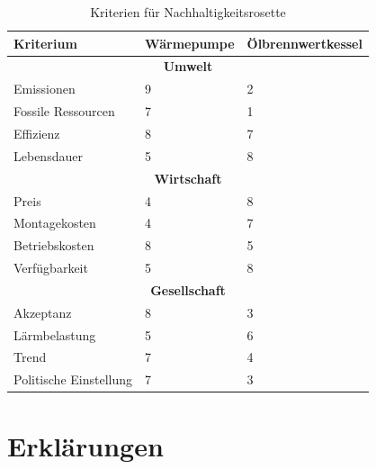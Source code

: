 \begin{table}
\begin{center}
\begin{tabular}[c]{|p{}|p{}|p{}|}

  \hline
  \textbf{Kriterium} &
  \textbf{Wärmepumpe} &
  \textbf{Ölbrennwertkessel} \\ \hline

  \multicolumn{3}{|c|}{\textbf{Umwelt}} \\ \hline
  
  Emissionen
  & 9 & 2 \\
  Fossile Ressourcen
  & 7 & 1 \\
  Effizienz
  & 8 & 7 \\
  Lebensdauer
  & 5 & 8 \\
  \hline
  
  \multicolumn{3}{|c|}{\textbf{Wirtschaft}} \\ \hline
  
  Preis
  & 4 & 8 \\
  Montagekosten
  & 4 & 7 \\
  Betriebskosten
  & 8 & 5 \\
  Verfügbarkeit
  & 5 & 8 \\
  \hline

  \multicolumn{3}{|c|}{\textbf{Gesellschaft}} \\ \hline

  Akzeptanz
  & 8 & 3 \\
  Lärmbelastung
  & 5 & 6 \\
  Trend
  & 7 & 4 \\
  Politische Einstellung
  & 7 & 3 \\
  \hline

\end{tabular}
\end{center}
\caption{Kriterien für Nachhaltigkeitsrosette}
\end{table}

\section{Erklärungen}


